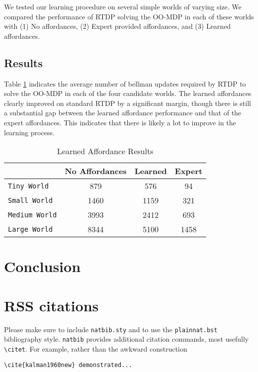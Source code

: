 \documentclass[conference]{IEEEtran}
\begin{document}
We tested our learning procedure on several simple worlds of varying size. We compared the performance of RTDP solving the OO-MDP
in each of these worlds with (1) No affordances, (2) Expert provided affordances, and (3) Learned affordances. 

\subsection{Results}

Table \ref{table:learned-results} indicates the average number of bellman updates required by RTDP to solve the OO-MDP
in each of the four candidate worlds. The learned affordances clearly improved on standard RTDP by a significant margin, though
there is still a substantial gap between the learned affordance performance and that of the expert affordances. This indicates that
there is likely a lot to improve in the learning process.

\begin{table}
\centering
\caption{Learned Affordance Results}
\begin{tabular}{ l || c c c }
  & No Affordances & Learned & Expert  \\ \hline
  \texttt{Tiny World}  		& 	879		&	576	&	 94	\\
  \texttt{Small World}  	& 	1460		&	1159	&	321  \\
  \texttt{Medium World}  	& 	3993		&	2412	&	693  \\
  \texttt{Large World}  	& 	8344		&	5100	&	1458
\end{tabular}
\label{table:learned-results}
\end{table}


\section{Conclusion}
\label{sec:conclusion}


\section{RSS citations}

Please make sure to include \verb!natbib.sty! and to use the
\verb!plainnat.bst! bibliography style. \verb!natbib! provides additional
citation commands, most usefully \verb!\citet!. For example, rather than the
awkward construction 

{\small
\begin{verbatim}
\cite{kalman1960new} demonstrated...
\end{verbatim}
}
\end{document}
